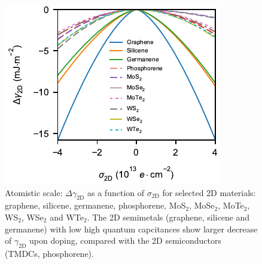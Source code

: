 \documentclass[journal=langd5,manuscript=article,email=true,hyperref=true,keywords=true]{achemso}
\begin{document}
\begin{figure}[htbp]
\centering
\includegraphics[width=0.75\linewidth]{../img/dgamma-sigma.pdf}
\caption{\label{fig:dgamma-sigma} Atomistic scale:
  \(\Delta \gamma_{\mathrm{2D}}\) as a function of
  \(\sigma_{\mathrm{2D}}\) for selected 2D materials: graphene,
  silicene, germanene, phosphorene, MoS\(_{2}\), MoSe\(_{2}\),
  MoTe\(_{2}\), WS\(_{2}\), WSe\(_{2}\) and WTe\(_{2}\). The 2D
  semimetals (graphene, silicene and germanene) with low high quantum
  capcitances show larger decrease of \(\gamma_{\mathrm{2D}}\) upon
  doping, compared with the 2D semiconductors (TMDCs, phosphorene).}
\end{figure}
\end{document}
